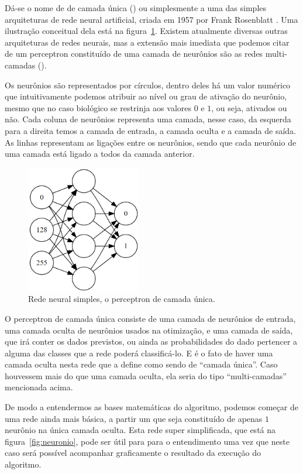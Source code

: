 Dá-se o nome de  de camada única () ou simplesmente  a uma das simples arquiteturas de rede neural artificial, criada em 1957 por Frank Rosenblatt \citep{frank}. Uma ilustração conceitual dela está na figura~\ref{fig:perceptron}. Existem atualmente diversas outras arquiteturas de redes neurais, mas a extensão mais imediata que podemos citar de um perceptron constituído de uma camada de neurônios são as redes  multi-camadas (). 

Os neurônios são representados por círculos, dentro deles há um valor numérico que intuitivamente podemos atribuir ao nível ou grau de ativação do neurônio, mesmo que no caso biológico se restrinja aos valores $0$ e $1$, ou seja, ativados ou não. Cada coluna de neurônios representa uma camada, nesse caso, da esquerda para a direita temos a camada de entrada, a camada oculta e a camada de saída. As linhas representam as ligações entre os neurônios, sendo que cada neurônio de uma camada está ligado a todos da camada anterior.

\begin{figure}[htb]
\centering
\includegraphics[width=5cm]{figuras/perceptron}
\caption{Rede neural simples, o perceptron de camada única.}
\label{fig:perceptron}
\end{figure}

O perceptron de camada única consiste de uma camada de neurônios de entrada, uma camada oculta de neurônios usados na otimização, e uma camada de saída, que irá conter os dados previstos, ou ainda as probabilidades do dado pertencer a alguma das classes que a rede poderá classificá-lo. E é o fato de haver uma camada oculta nesta rede que a define como sendo de ``camada única''. Caso houvessem mais do que uma camada oculta, ela seria do tipo ``multi-camadas'' mencionada acima.

De modo a entendermos as bases matemáticas do algoritmo, podemos começar de uma rede ainda mais básica, a partir um  que seja constituído de apenas $1$ neurônio na única camada oculta. Esta rede super simplificada, que está na figura~\ref{fig:neuronio}, pode ser útil para para o entendimento uma vez que neste caso será possível acompanhar graficamente o resultado da execução do algoritmo.

